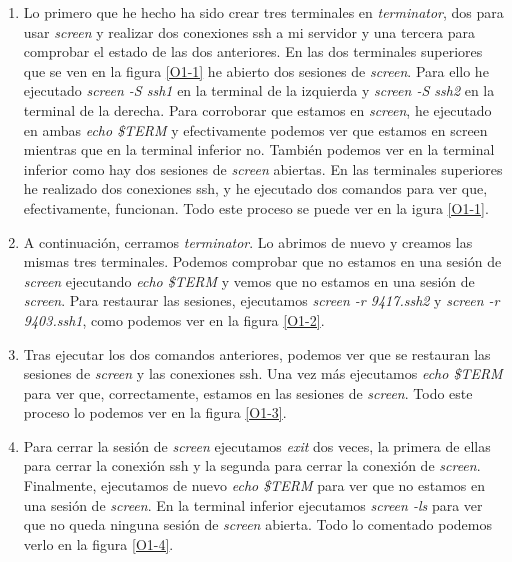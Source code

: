 \documentclass[a4paper,titlepage,12pt]{scrartcl}	%
\numberwithin{figure}{section} %
\numberwithin{table}{section} %
\begin{document}
	\begin{enumerate}
		\item Lo primero que he hecho ha sido crear tres terminales en \textit{terminator}, dos para usar \textit{screen} y realizar dos conexiones ssh a mi servidor y una tercera para comprobar el estado de las dos anteriores. En las dos terminales superiores que se ven en la figura \ref{O1-1} he abierto dos sesiones de \textit{screen}. Para ello he ejecutado \textit{screen -S ssh1} en la terminal de la izquierda y \textit{screen -S ssh2} en la terminal de la derecha. Para corroborar que estamos en \textit{screen}, he ejecutado en ambas \textit{echo \$TERM} y efectivamente podemos ver que estamos en screen mientras que en la terminal inferior no. También podemos ver en la terminal inferior como hay dos sesiones de \textit{screen} abiertas. En las terminales superiores he realizado dos conexiones ssh, y he ejecutado dos comandos para ver que, efectivamente, funcionan. Todo este proceso se puede ver en la igura \ref{O1-1}.
		\item A continuación, cerramos \textit{terminator}. Lo abrimos de nuevo y creamos las mismas tres terminales. Podemos comprobar que no estamos en una sesión de \textit{screen} ejecutando \textit{echo \$TERM} y vemos que no estamos en una sesión de \textit{screen}. Para restaurar las sesiones, ejecutamos \textit{screen -r 9417.ssh2} y \textit{screen -r 9403.ssh1}, como podemos ver en la figura \ref{O1-2}.
		\item Tras ejecutar los dos comandos anteriores, podemos ver que se restauran las sesiones de \textit{screen} y las conexiones ssh. Una vez más ejecutamos \textit{echo \$TERM} para ver que, correctamente, estamos en las sesiones de \textit{screen}. Todo este proceso lo podemos ver en la figura \ref{O1-3}.
		\item Para cerrar la sesión de \textit{screen} ejecutamos \textit{exit} dos veces, la primera de ellas para cerrar la conexión ssh y la segunda para cerrar la conexión de \textit{screen}. Finalmente, ejecutamos de nuevo \textit{echo \$TERM} para ver que no estamos en una sesión de \textit{screen}. En la terminal inferior ejecutamos \textit{screen -ls} para ver que no queda ninguna sesión de \textit{screen} abierta. Todo lo comentado podemos verlo en la figura \ref{O1-4}.
	\end{enumerate}
	
\end{document}
